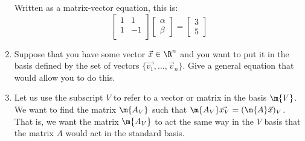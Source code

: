 \begin{enumerate}
{Written as a matrix-vector equation, this is:
$$
\begin{bmatrix}
1 & 1 \\
1 & -1 \\
\end{bmatrix}
\begin{bmatrix}\alpha \\ \beta \end{bmatrix} = \begin{bmatrix}3 \\ 5 \end{bmatrix}
$$
}

\item Suppose that you have some vector $\vec{x} \in \R^n$ and you want to put it in the basis defined by the set of vectors $\{\vec{v_1}, \ldots, \vec{v}_n\}$. Give a general equation that would allow you to do this.


\item { Let us use the subscript $V$ to refer to a vector or matrix in the basis $\m{V}$. We want to find the matrix $\m{A_V}$ such that $\m{A_V}\vec{x_V} = (\m{A}\vec{x})_V$. That is, we want the matrix $\m{A_V}$ to act the same way in the $V$ basis that the matrix $A$ would act in the standard basis.
}



\end{enumerate}
